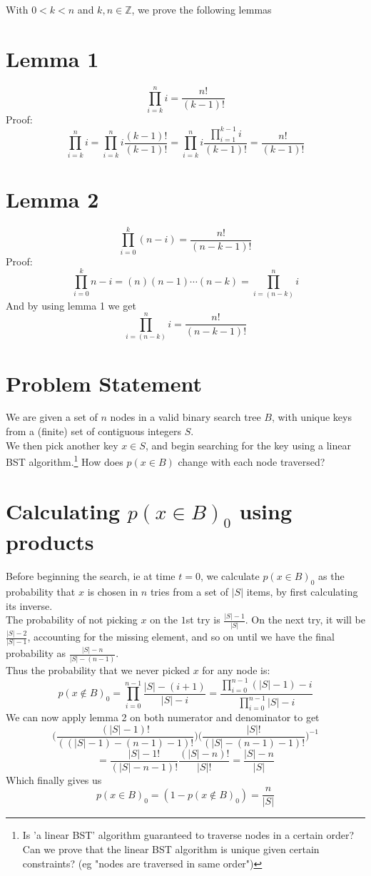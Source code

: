 \documentclass[10pt,a4paper]{article}
\author{Christian Burke}
\begin{document}
With $0 < k < n$ and $k,n \in \mathbb{Z}$, we prove the following lemmas
\section*{Lemma 1}
$$ \prod_{i=k}^n i = \frac{n!}{(k-1)!}$$
Proof:
$$ \prod_{i=k}^n i = \prod_{i=k}^{n} i \frac{(k-1)!}{(k-1)!}
 = \prod_{i=k}^n i \frac{\prod_{i=1}^{k-1} i}{(k-1)!}
 = \frac{n!}{(k-1)!}$$
\section*{Lemma 2}
$$ \prod_{i=0}^k (n-i) = \frac{n!}{(n-k-1)!}$$
Proof:
$$ \prod_{i=0}^k n-i = (n)(n-1)\cdots(n-k) = \prod_{i=(n-k)}^n i$$
And by using lemma 1 we get
$$ \prod_{i=(n-k)}^n i = \frac{n!}{(n-k-1)!}$$
\section*{Problem Statement}
We are given a set of $n$ nodes in a valid binary search tree $B$, with unique keys from a (finite) set of contiguous integers $S$.\\
We then pick another key $x \in S$, and begin searching for the key using a linear BST algorithm.\footnote{Is 'a linear BST' algorithm guaranteed to traverse nodes in a certain order? Can we prove that the linear BST algorithm is unique given certain constraints? (eg "nodes are traversed in same order")}
How does $p(x \in B)$ change with each node traversed?\\
\section*{Calculating $p(x \in B)_0$ using products}
Before beginning the search, ie at time $t=0$, we calculate $p(x \in B)_0$ as the probability that $x$ is chosen in $n$ tries from a set of $|S|$ items, by first calculating its inverse.\\
The probability of not picking $x$ on the $1$st try is $\frac{|S|-1}{|S|}$. On the next try, it will be $\frac{|S|-2}{|S|-1}$, accounting for the missing element, and so on until we have the final probability as $\frac{|S|-n}{|S| - (n-1)}$.\\
Thus the probability that we never picked $x$ for any node is:
$$p(x \not \in B)_0 = \prod_{i = 0}^{n-1} \frac{|S|-(i+1)}{|S| - i} = \frac{\prod_{i = 0}^{n-1} (|S|-1)-i}{\prod_{i = 0}^{n-1} |S| - i}$$
We can now apply lemma 2 on both numerator and denominator to get
$$
\bigg(\frac{(|S|-1)!}{((|S|-1) - (n-1) - 1)!}\bigg)
\bigg(\frac{|S|!}{(|S| - (n-1) - 1)!}\bigg)^{-1}
$$
$$
= 
\frac{|S|-1!}{(|S|-n-1)!}
\frac{(|S|-n)!}{|S|!}
= \frac{|S|-n}{|S|}
$$
Which finally gives us\\
$$p(x \in B)_0 = (1-p(x \not \in B)_0) = \frac{n}{|S|}$$
\end{document}
